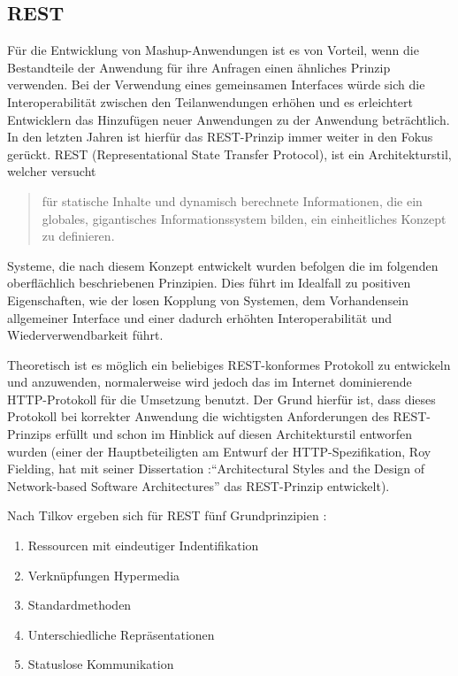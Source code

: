\subsection{REST}\label{section:rest}
Für die Entwicklung von Mashup-Anwendungen ist es von Vorteil, wenn die Bestandteile der Anwendung für ihre Anfragen einen ähnliches Prinzip verwenden. Bei der Verwendung eines gemeinsamen Interfaces würde sich die Interoperabilität zwischen den Teilanwendungen erhöhen und es erleichtert Entwicklern das Hinzufügen neuer Anwendungen zu der Anwendung beträchtlich. In den letzten Jahren ist hierfür das REST-Prinzip immer weiter in den Fokus  gerückt.
REST (Representational State Transfer Protocol), ist ein Architekturstil, welcher versucht 
\begin{quotation}
für statische Inhalte und dynamisch berechnete Informationen, die ein globales, gigantisches Informationssystem bilden, ein einheitliches Konzept zu definieren\cite{tilkovrestchapter2}.
\end{quotation}
Systeme, die nach diesem Konzept entwickelt wurden befolgen die im folgenden oberflächlich beschriebenen Prinzipien. Dies führt im Idealfall zu positiven Eigenschaften, wie der losen Kopplung von Systemen, dem Vorhandensein allgemeiner Interface und einer dadurch erhöhten Interoperabilität und Wiederverwendbarkeit führt\cite{tilkovrestchapter2}.

Theoretisch ist es möglich ein beliebiges REST-konformes Protokoll zu entwickeln und anzuwenden, normalerweise wird jedoch das im Internet dominierende HTTP-Protokoll für die Umsetzung benutzt. Der Grund hierfür ist, dass dieses Protokoll bei korrekter Anwendung die wichtigsten Anforderungen des REST-Prinzips erfüllt und schon im Hinblick auf diesen Architekturstil entworfen wurden (einer der Hauptbeteiligten am Entwurf der HTTP-Spezifikation, Roy Fielding, hat mit seiner Dissertation :"`Architectural Styles and the Design of Network-based Software Architectures"' das REST-Prinzip entwickelt). 

Nach Tilkov ergeben sich für REST fünf Grundprinzipien \cite{tilkovrestchapter2}:
\begin{enumerate}
 \item\label{enumerate_rest_principles:1} Ressourcen mit eindeutiger Indentifikation
 \item\label{enumerate_rest_principles:2} Verknüpfungen Hypermedia
 \item\label{enumerate_rest_principles:3} Standardmethoden
 \item\label{enumerate_rest_principles:4} Unterschiedliche Repräsentationen
 \item\label{enumerate_rest_principles:5} Statuslose Kommunikation
\end{enumerate}

